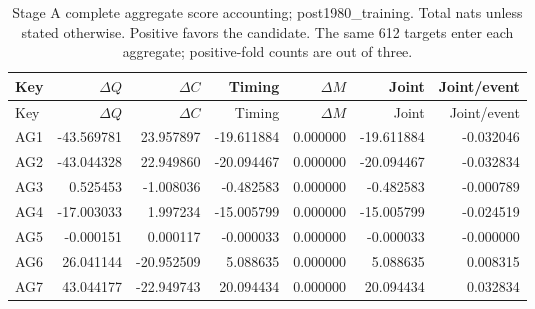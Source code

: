 {\small
\setlength{\tabcolsep}{3pt}
\begin{longtable}{lrrrrrr}
\caption{Stage A complete aggregate score accounting; post1980\_training. Total nats unless stated otherwise. Positive favors the candidate. The same 612 targets enter each aggregate; positive-fold counts are out of three.}\label{tab:AG-post1980_training}\\
\toprule
Key & $\Delta Q$ & $\Delta C$ & Timing & $\Delta M$ & Joint & Joint/event\\\midrule
\endfirsthead
\toprule
Key & $\Delta Q$ & $\Delta C$ & Timing & $\Delta M$ & Joint & Joint/event\\\midrule
\endhead
AG1 & -43.569781 & 23.957897 & -19.611884 & 0.000000 & -19.611884 & -0.032046\\
AG2 & -43.044328 & 22.949860 & -20.094467 & 0.000000 & -20.094467 & -0.032834\\
AG3 & 0.525453 & -1.008036 & -0.482583 & 0.000000 & -0.482583 & -0.000789\\
AG4 & -17.003033 & 1.997234 & -15.005799 & 0.000000 & -15.005799 & -0.024519\\
AG5 & -0.000151 & 0.000117 & -0.000033 & 0.000000 & -0.000033 & -0.000000\\
AG6 & 26.041144 & -20.952509 & 5.088635 & 0.000000 & 5.088635 & 0.008315\\
AG7 & 43.044177 & -22.949743 & 20.094434 & 0.000000 & 20.094434 & 0.032834\\
\bottomrule
\end{longtable}
}

